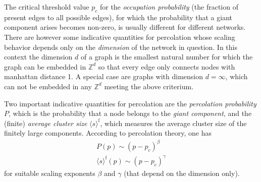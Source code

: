 \documentclass{scrartcl}
\begin{document}
The critical threshold value $p_c$ for the \emph{occupation probability}
(the fraction of present edges to all possible edges), for which the
probability that a giant component arises becomes non-zero, is usually
different for different networks. There are however some indicative
quantities for percolation whose scaling behavior depends only on the
\emph{dimension} of the network in question. In this context the dimension $d$
of a graph is the smallest natural number for which the graph can be embedded in
$\mathbb{Z}^d$ so that every edge only connects nodes with manhattan distance 1.
A special case are graphs with dimension $d=\infty$, which can not be embedded in any
$\mathbb{Z}^d$ meeting the above criterium.

Two important indicative quantities for percolation are the
\emph{percolation probability} $P$, which is the probability that a node
belongs to the \emph{giant component}, and the (finite) \emph{average
cluster size} $\langle s \rangle^\mathrm{f}$, which measures the average
cluster size of the finitely large components. According to percolation theory, one has
\begin{equation}\label{eq:coefficients}
\begin{aligned}
    P(p) \sim (p - p_c)^\beta \\
    \langle s \rangle^\mathrm{f}(p) \sim (p - p_c)^\gamma
\end{aligned}
\end{equation}
for suitable scaling exponents $\beta$ and $\gamma$ (that depend on the dimension only).
\end{document}
